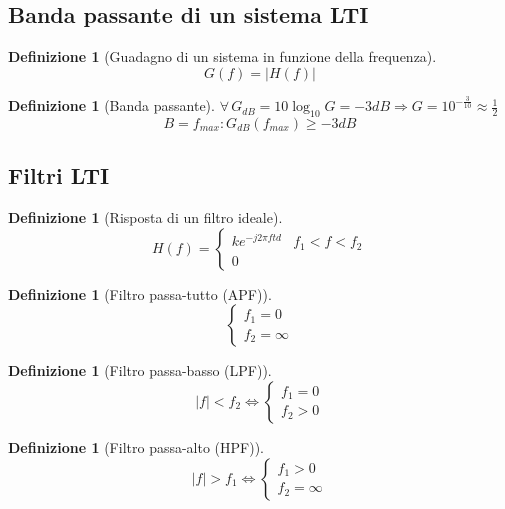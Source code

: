 \documentclass[a4paper,10pt]{article}
\theoremstyle{mystyle}
\newtheorem{definition}[theorem]{Definizione}
\begin{document}
\subsection{Banda passante di un sistema LTI}
\begin{definition}[Guadagno di un sistema in funzione della frequenza]
    \[G(f) = \lvert H(f) \rvert\]
\end{definition}

\begin{definition}[Banda passante]
    \(\forall \, G_{dB} = 10 \log_{10} G = -3 dB \Rightarrow G= 10^{-\frac{3}{10}} \approx \frac{1}{2}\)
    \[B=f_{max} : G_{dB} (f_{max}) \geq -3 dB\]
\end{definition}

\subsection{Filtri LTI}

\begin{definition}[Risposta di un filtro ideale]
    \[H(f) =
    \begin{cases}
        ke^{-j2 \pi f t d} & f_1<f<f_2\\
        0
    \end{cases}\]
\end{definition}

\begin{definition}[Filtro passa-tutto (APF)]
    \[
        \begin{cases}
            f_1=0 \\
            f_2= \infty
        \end{cases}
    \]
\end{definition}

\begin{definition}[Filtro passa-basso (LPF)]
    \[
    \lvert f \rvert < f_2 \Leftrightarrow
        \begin{cases}
            f_1=0   \\
            f_2>0
        \end{cases}
    \]
\end{definition}

\begin{definition}[Filtro passa-alto (HPF)]
    \[
    \lvert f \rvert > f_1 \Leftrightarrow
        \begin{cases}
            f_1>0 \\
            f_2= \infty
        \end{cases}
    \]
\end{definition}
\end{document}
